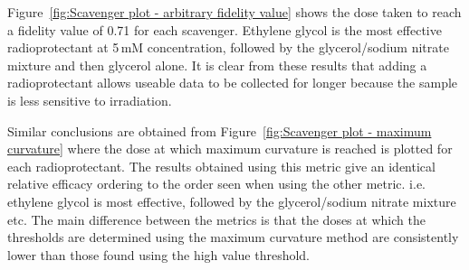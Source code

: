 Figure~\ref{fig:Scavenger plot - arbitrary fidelity value} shows the dose taken to reach a fidelity value of 0.71 for each scavenger.
Ethylene glycol is the most effective radioprotectant at 5$\,$mM concentration, followed by the glycerol/sodium nitrate mixture and then glycerol alone.
It is clear from these results that adding a radioprotectant allows useable data to be collected for longer because the sample is less sensitive to irradiation.

Similar conclusions are obtained from Figure~\ref{fig:Scavenger plot - maximum curvature} where the dose at which maximum curvature is reached is plotted for each radioprotectant.
The results obtained using this metric give an identical relative efficacy ordering to the order seen when using the other metric. i.e. ethylene glycol is most effective, followed by the glycerol/sodium nitrate mixture etc.
The main difference between the metrics is that the doses at which the thresholds are determined using the maximum curvature method are consistently lower than those found using the high value threshold.
